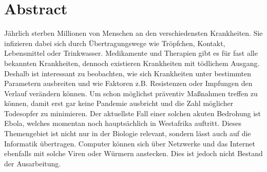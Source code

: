 \section*{Abstract}
Jährlich sterben Millionen von Menschen an den verschiedensten Krankheiten. Sie infizieren dabei sich durch Übertragungswege wie Tröpfchen, Kontakt, Lebensmittel oder Trinkwasser. Medikamente und Therapien gibt es für fast alle bekannten Krankheiten, dennoch existieren Krankheiten mit tödlichem Ausgang. 
Deshalb ist interessant zu beobachten, wie sich Krankheiten unter bestimmten Parametern ausbreiten und wie Faktoren z.B. Resistenzen oder Impfungen den Verlauf verändern können. Um schon möglichst präventiv Maßnahmen treffen zu können, damit erst gar keine Pandemie ausbricht und die Zahl möglicher Todesopfer zu minimieren. Der aktuellste Fall einer solchen akuten Bedrohung ist Ebola, welches momentan noch hauptsächlich in Westafrika auftritt. Dieses Themengebiet ist nicht nur in der Biologie relevant, sondern lässt auch auf die Informatik übertragen. Computer können sich über Netzwerke und das Internet ebenfalls mit solche Viren oder Würmern anstecken. Dies ist jedoch nicht Bestand der Ausarbeitung.